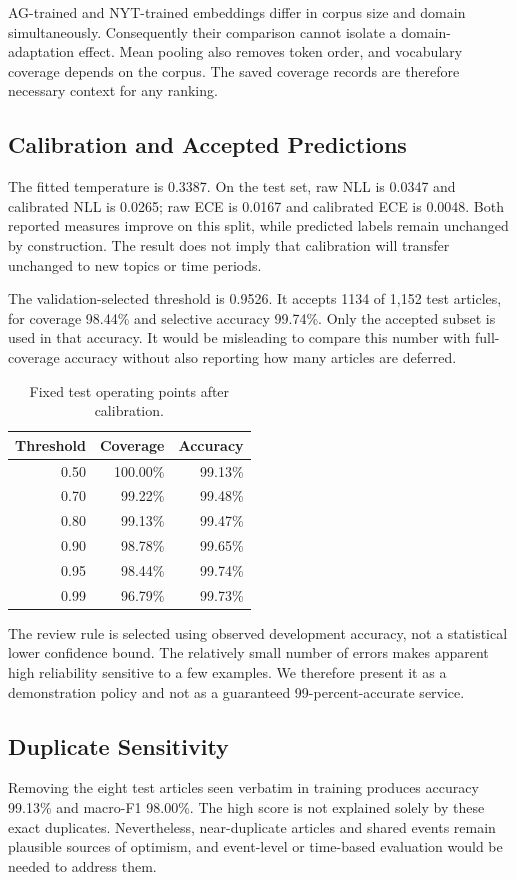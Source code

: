 \documentclass[11pt]{article}
\begin{document}
AG-trained and NYT-trained embeddings differ in corpus size and domain simultaneously. Consequently their comparison cannot isolate a domain-adaptation effect. Mean pooling also removes token order, and vocabulary coverage depends on the corpus. The saved coverage records are therefore necessary context for any ranking.

\subsection{Calibration and Accepted Predictions}
The fitted temperature is 0.3387. On the test set, raw NLL is 0.0347 and calibrated NLL is 0.0265; raw ECE is 0.0167 and calibrated ECE is 0.0048. Both reported measures improve on this split, while predicted labels remain unchanged by construction. The result does not imply that calibration will transfer unchanged to new topics or time periods.

The validation-selected threshold is 0.9526. It accepts 1134 of 1,152 test articles, for coverage 98.44\% and selective accuracy 99.74\%. Only the accepted subset is used in that accuracy. It would be misleading to compare this number with full-coverage accuracy without also reporting how many articles are deferred.

\begin{table}[h]\centering\small
\begin{tabular}{rrr}\toprule
Threshold & Coverage & Accuracy\\\midrule
0.50 & 100.00\% & 99.13\% \\
0.70 & 99.22\% & 99.48\% \\
0.80 & 99.13\% & 99.47\% \\
0.90 & 98.78\% & 99.65\% \\
0.95 & 98.44\% & 99.74\% \\
0.99 & 96.79\% & 99.73\% \\
\bottomrule\end{tabular}
\caption{Fixed test operating points after calibration.}
\end{table}

The review rule is selected using observed development accuracy, not a statistical lower confidence bound. The relatively small number of errors makes apparent high reliability sensitive to a few examples. We therefore present it as a demonstration policy and not as a guaranteed 99-percent-accurate service.

\subsection{Duplicate Sensitivity}
Removing the eight test articles seen verbatim in training produces accuracy 99.13\% and macro-F1 98.00\%. The high score is not explained solely by these exact duplicates. Nevertheless, near-duplicate articles and shared events remain plausible sources of optimism, and event-level or time-based evaluation would be needed to address them.
\clearpage
\end{document}
